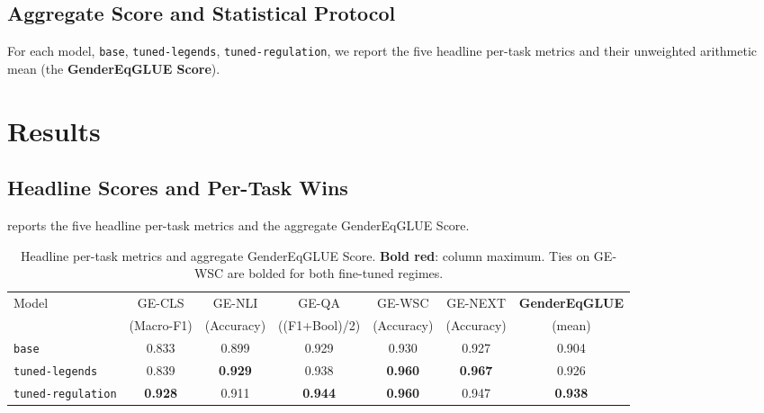 \documentclass[pdflatex, sn-apa]{sn-jnl}%
\theoremstyle{thmstyleone}%
\theoremstyle{thmstyletwo}%
\theoremstyle{thmstylethree}%
\newcommand{\best}[1]{\textcolor{bestred}{\textbf{#1}}}
\newcommand{\modelbase}{\texttt{base}}
\newcommand{\modellegends}{\texttt{tuned-legends}}
\newcommand{\modelreg}{\texttt{tuned-regulation}}
\begin{document}
\subsection{Aggregate Score and Statistical Protocol}
\label{sec:bench:protocol}

For each model, \modelbase, \modellegends, \modelreg{}, we report the five
headline per-task metrics and their unweighted arithmetic mean (the
\textbf{GenderEqGLUE Score}).

\FloatBarrier
\section{Results}
\label{sec:results}

\subsection{Headline Scores and Per-Task Wins}
\label{sec:results:headline}

 reports the five headline per-task metrics and the aggregate
GenderEqGLUE Score.

\begin{table}[h]
\centering
\caption{Headline per-task metrics and aggregate GenderEqGLUE Score.
\best{Bold red}: column maximum. Ties on GE-WSC are bolded for both fine-tuned
regimes.}
\label{tab:headline}
\small
\begin{tabular}{@{}lcccccc@{}}
\toprule
Model            & GE-CLS         & GE-NLI         & GE-QA          & GE-WSC
& GE-NEXT        & \textbf{GenderEqGLUE} \\
                 & (Macro-F1)     & (Accuracy)     & ((F1+Bool)/2)  & (Accuracy)
                 & (Accuracy)     & (mean)                \\
\midrule
\modelbase       & 0.833          & 0.899          & 0.929          & 0.930
& 0.927          & 0.904                 \\
\modellegends    & 0.839          & \best{0.929}   & 0.938          &
\best{0.960}   & \best{0.967}   & 0.926                 \\
\modelreg        & \best{0.928}   & 0.911          & \best{0.944}   &
\best{0.960}   & 0.947          & \best{0.938}          \\
\bottomrule
\end{tabular}
\end{table}
\end{document}
